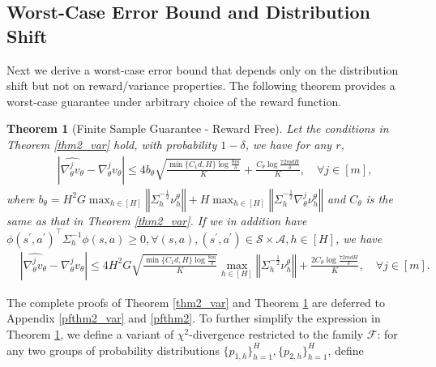 \documentclass{article}
\newtheorem{theorem}{Theorem}[section]
\numberwithin{equation}{section}
\begin{document}
\subsection{Worst-Case Error Bound and Distribution Shift}
Next we derive a worst-case error bound that depends only on the distribution shift but not on reward/variance properties. The following theorem provides a worst-case guarantee under arbitrary choice of the reward function. 
\begin{theorem}[Finite Sample Guarantee - Reward Free]
\label{thm2}
Let the conditions in Theorem \ref{thm2_var} hold, with probability $1-\delta$, we have for any $r$,
\begin{align*}
&\left\vert\widehat{\nabla_\theta^j v_\theta}-\nabla_\theta^j v_\theta\right\vert\leq 4b_\theta\sqrt{\frac{\min\{C_1d,H\}\log\frac{8m}{\delta}}{K}}+\frac{C_\theta\log\frac{72mdH}{\delta}}{K}, \quad\forall j\in[m],
\end{align*}
where $b_\theta=H^2G\max_{h\in[H]}\left\Vert\Sigma_h^{-\frac{1}{2}}\nu_h^\theta\right\Vert+H\max_{h\in[H]}\left\Vert\Sigma_h^{-\frac{1}{2}}\nabla_\theta^j\nu_h^\theta\right\Vert$ and $C_\theta$ is the same as that in Theorem \ref{thm2_var}. If we in addition have $\phi(s^\prime,a^\prime)^\top\Sigma_{h}^{-1}\phi(s,a)\geq 0,\forall (s,a),(s^\prime,a^\prime)\in\mathcal{S}\times\mathcal{A},h\in[H]$, we have
\begin{align*}
&\left\vert\widehat{\nabla_\theta^j v_\theta}-\nabla_\theta^j v_\theta\right\vert\leq 4H^2G\sqrt{\frac{\min\{C_1d,H\}\log\frac{8m}{\delta}}{K}}\max_{h\in[H]}\left\Vert\Sigma_h^{-\frac{1}{2}}\nu_h^\theta\right\Vert+\frac{2C_\theta\log\frac{72mdH}{\delta}}{K}, \quad\forall j\in[m].
\end{align*}
\end{theorem}
The complete proofs of Theorem \ref{thm2_var} and Theorem \ref{thm2} are deferred to Appendix \ref{pfthm2_var} and \ref{pfthm2}. To further simplify the expression in Theorem \ref{thm2}, we define a variant of $\chi^2$-divergence restricted to the family $\mathcal{F}$: for any two groups of probability distributions $\{p_{1,h}\}_{h=1}^H, \{p_{2,h}\}_{h=1}^H$, define
\end{document}
